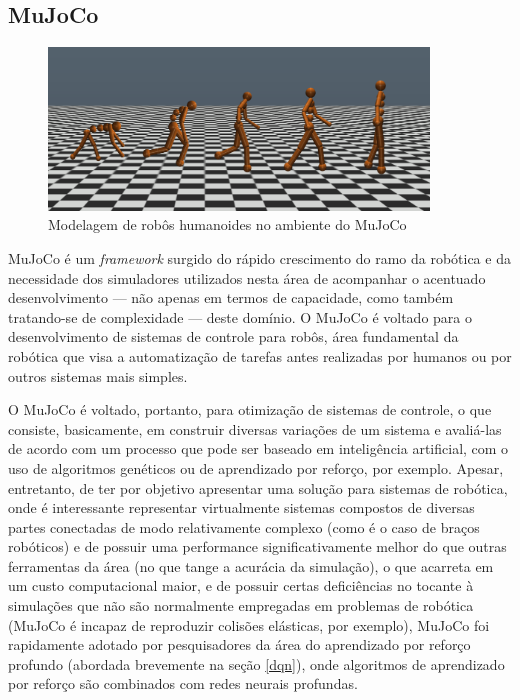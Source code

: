 \documentclass[cic,tc]{iiufrgs}
\begin{document}
\subsection{MuJoCo}
\label{sec:mujocosubsec}

\begin{figure}[h]
    \caption{Modelagem de robôs humanoides no ambiente do MuJoCo}
    \begin{center}
      \includegraphics[width=0.9\textwidth]{mujoco_humanoids.png}
    \end{center}
    \label{fig:humanoids_mujoco}
\end{figure}



MuJoCo \cite{mujoco2009}  é um \textit{framework} surgido do rápido crescimento do ramo da
robótica e da necessidade dos simuladores utilizados nesta área de acompanhar
o acentuado desenvolvimento --- não apenas em termos de capacidade, como também
tratando-se de complexidade --- deste domínio. O MuJoCo é voltado para o
desenvolvimento de sistemas de controle para robôs, área fundamental da robótica
que visa a automatização de tarefas antes realizadas por humanos ou por outros
sistemas mais simples.


O MuJoCo é voltado, portanto, para otimização de sistemas de controle, o que
consiste, basicamente, em construir diversas variações de um sistema e
avaliá-las de acordo com um processo que pode ser baseado em inteligência
artificial, com o uso de algoritmos genéticos ou de aprendizado por reforço, por
exemplo. Apesar, entretanto, de ter por objetivo apresentar uma solução para
sistemas de robótica, onde é interessante representar virtualmente sistemas
compostos de diversas partes conectadas de modo relativamente complexo (como é
o caso de braços robóticos) e de possuir uma performance significativamente
melhor do que outras ferramentas da área (no que tange a acurácia da simulação),
o que acarreta em um custo computacional maior, e de possuir certas deficiências
no tocante à simulações que não são normalmente empregadas em problemas de
robótica (MuJoCo é incapaz de reproduzir colisões elásticas, por exemplo),
MuJoCo foi rapidamente
adotado por pesquisadores da área do aprendizado por reforço profundo
(abordada brevemente na seção \ref{dqn}), onde algoritmos de aprendizado por
reforço são combinados com redes neurais profundas.
\end{document}

